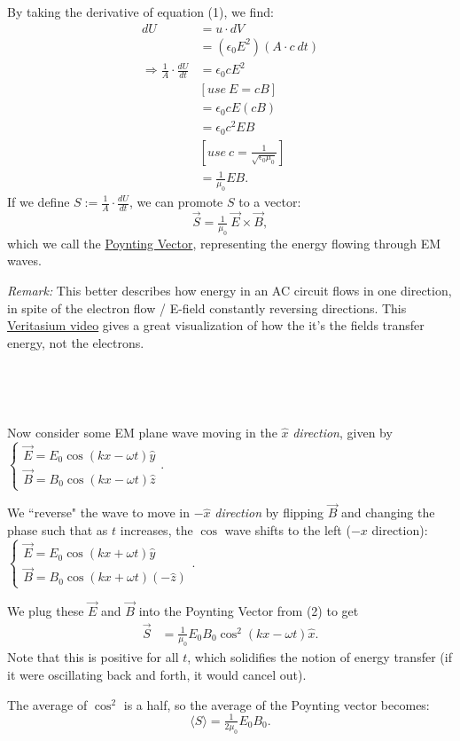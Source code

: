 \documentclass{article}
\begin{document}
By taking the derivative of equation (1), we find:
\begin{align*}
dU & =u\cdot dV\\
 & =\left( \epsilon _{0} E^{2}\right)( A\cdot c\ dt)\\
\Rightarrow \frac{1}{A} \cdot \frac{dU}{dt} & =\epsilon _{0} cE^{2}\\
 & [ use\ E=cB]\\
 & =\epsilon _{0} cE( cB)\\
 & =\epsilon _{0} c^{2} EB\\
 & \left[ use\ c=\tfrac{1}{\sqrt{\epsilon _{0} \mu _{0}}}\right]\\
 & =\tfrac{1}{\mu _{0}} EB.
\end{align*}
If we define $S:=\frac{1}{A} \cdot \frac{dU}{dt}$, we can promote $S$ to a vector:
\begin{equation}
\boxed{\vec{S} =\tfrac{1}{\mu _{0}} \ \vec{E} \times \vec{B} ,}
\end{equation}
which we call the \underline{Poynting Vector}, representing the energy flowing through EM waves.



\textit{Remark:} This better describes how energy in an AC circuit flows in one direction, in spite of the electron flow / E-field constantly reversing directions. This \href{https://www.veritasium.com/videos/2021/11/19/the-big-misconception-about-electricity}{Veritasium video} gives a great visualization of how the it's the fields transfer energy, not the electrons. 

\

\


Now consider some EM plane wave moving in the $\hat{x}$\textit{ direction}, given by $\begin{cases}
\vec{E} =E_{0}\cos( kx-\omega t)\hat{y}\\
\vec{B} =B_{0}\cos( kx-\omega t)\hat{z}
\end{cases}$.

We ``reverse" the wave to move in $-\hat{x}$\textit{ direction} by flipping $\vec{B}$ and changing the phase such that as $t$ increases, the $\cos$ wave shifts to the left ($-x$ direction): $\begin{cases}
\vec{E} =E_{0}\cos( kx+\omega t)\hat{y}\\
\vec{B} =B_{0}\cos( kx+\omega t)( -\hat{z})
\end{cases}$.

We plug these $\vec{E}$ and $\vec{B}$ into the Poynting Vector from (2) to get
\begin{align*}
\vec{S} & =\tfrac{1}{\mu _{0}} E_{0} B_{0}\cos^{2}( kx-\omega t)\hat{x} .
\end{align*}
Note that this is positive for all $t$, which solidifies the notion of energy transfer (if it were oscillating back and forth, it would cancel out). 



The average of $\cos^{2}$ is a half, so the average of the Poynting vector becomes:
\begin{equation*}
\boxed{\langle S\rangle =\tfrac{1}{2\mu _{0}} E_{0} B_{0} .}
\end{equation*}

\

\hline

\end{document}
